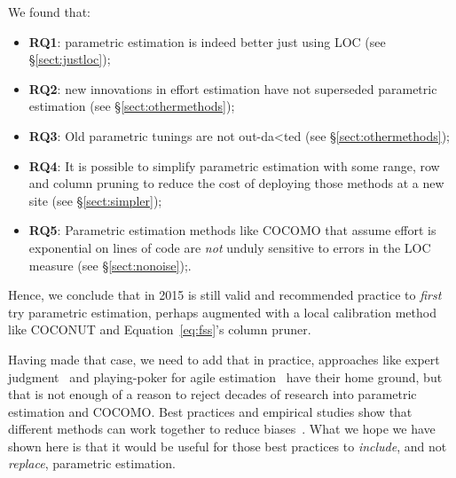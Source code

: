 \documentclass{sig-alternate}
\newcommand{\bi}{\begin{itemize}}
\newcommand{\ei}{\end{itemize}}
\newcommand{\tion}[1]{\S\ref{sect:#1}}
\begin{document}
We found that:
\bi
\item {\bf RQ1}: parametric estimation is indeed
better just using LOC (see \tion{justloc}); 
\item {\bf RQ2}: new innovations in effort estimation have not superseded parametric estimation (see \tion{othermethods});
\item {\bf RQ3}: Old parametric tunings are not out-da<ted (see \tion{othermethods});
\item {\bf RQ4}: It is possible to simplify parametric estimation with some range, row and column pruning to reduce the cost
of deploying those methods at a new site (see \tion{simpler});
\item {\bf RQ5}: Parametric estimation methods like COCOMO that assume effort is exponential on lines of code are {\em not} unduly
sensitive to errors in the LOC measure (see \tion{nonoise});.
\ei
Hence, we conclude that in 2015 is still valid and recommended practice to {\em first} try parametric estimation,
perhaps  augmented with a local calibration method like COCONUT
and Equation~\ref{eq:fss}'s  column pruner.


Having made that case, we need to add that in 
practice, approaches like expert judgment~\cite{jorgensen09}  and
playing-poker for agile estimation~\cite{molokk08} have their home
ground, but that is not enough of a reason to reject decades of research into parametric estimation
and 
COCOMO. Best practices and empirical studies
show that different methods can work together to
reduce biases~\cite{yang08aa}. What we hope we have shown here is that it would be useful for those best practices
to {\em include}, and not {\em replace}, parametric estimation.

\end{document}
